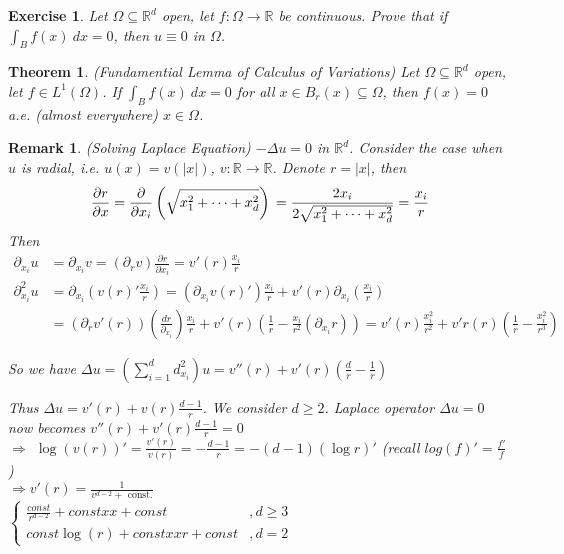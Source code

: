 \documentclass{report}
\theoremstyle{tommy}
\newtheorem{thm}[defn]{Theorem}
\newtheorem{rem}[defn]{Remark}
\newtheorem{ex}[defn]{Exercise}
\begin{document}
  \begin{ex}
    Let \(\Omega \subseteq \mathbb{R}^d\) open, let \(f: \Omega \to \mathbb{R}\) be continuous. Prove that if \( \int_B f(x) \ dx = 0 \), then \( u \equiv 0 \) in \(\Omega\).
  \end{ex}

  \begin{thm} (Fundamential Lemma of Calculus of Variations)
    Let \(\Omega \subseteq \mathbb{R}^d\) open, let \(f \in L^1(\Omega)\). If 
    \(\int_B f(x) \ dx = 0\) for all \(x \in B_r(x) \subseteq \Omega\), then \(f(x) = 0\) a.e. (almost everywhere) \(x \in \Omega\).
  \end{thm}

  \begin{rem} (Solving Laplace Equation)
    \(-\Delta u = 0\) in \(\mathbb{R}^d\). Consider the case when \(u\) is radial, i.e. \(u(x) = v(|x|)\), \(v: \mathbb{R} \to \mathbb{R}\). Denote \(r = |x|\), then 
    \[
      \frac{\partial r}{\partial x} 
      = \frac{\partial}{\partial x_i}  \left(\sqrt{x_1^2 + \dots + x_d^2}\right) \\
      = \frac{2 x_i}{2{\sqrt{x_1^2 + \dots + x_d^2}}} \\
      = \frac{x_i}{r}
    \]
    Then
    \begin{align*}
      \partial_{x_i} u &= \partial_{x_i} v = (\partial_r v) \frac{\partial r}{\partial {x_i}} 
      = v'(r) \frac{x_i}{r} \\
      \partial^2_{x_i} u 
      &= \partial_{x_i} \left(v(r)' \frac{x_i}{r}\right) 
      = (\partial_{x_i}v(r)') \frac{x_i}{r} + v'(r) \partial_{x_i} \left(\frac{x_i}{r}\right) \\
      &= (\partial_r v'(r))\left(\frac{dr}{\partial_{x_i}}\right) \frac{x_i}{r} + v'(r)\left( \frac{1}{r} - \frac{x_i}{r^2}(\partial_{x_i} r) \right) 
      = v'(r) \frac{x_i^2}{r^2} + v'r(r)\left(\frac{1}{r} - \frac{x_i^2}{r^3}\right)
    \end{align*}

    So we have \(\Delta u = \left( \sum_{i=1}^d d_{x_i}^2 \right) u = v''(r) + v'(r) (\frac{d}{r} - \frac{1}{r})\)

    Thus \(\Delta u = v'(r) + v(r) \frac{d-1}{r}\). We consider \(d \ge 2\). Laplace operator \(\Delta u = 0\) now becomes \(v''(r) + v'(r) \frac{d-1}{r} = 0\) \\
    \(\Rightarrow\) \(\log(v(r))' = \frac{v'(r)}{v(r)} = - \frac{d-1}{r} = -(d-1)(\log r)'\) (recall \(log(f)' = \frac{f'}{f}\)) \\
    \(\Rightarrow v'(r) = \frac{1}{v^{d-2} + \text{ const.}}\) \\
    \(\begin{cases}
      \frac{const}{r^{d-2}} + const xx + const &,d \ge 3 \\
      const \log(r) + const xx r + const &,d = 2
    \end{cases}\)
  \end{rem}
\end{document}

